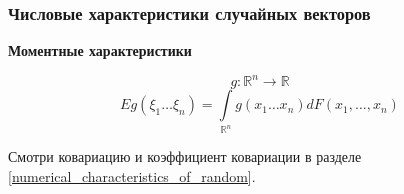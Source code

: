 \subsubsection{Числовые характеристики случайных векторов}
\begin{figure}[H]
\end{figure}

\begin{center}
	\textbf{Моментные характеристики}
\end{center}
\[ g: \mathbb{R}^n \to \mathbb{R} \]
\[ Eg (\xi_1 \dots \xi_n) = \int\limits_{\mathbb{R}^n} g (x_1 \dots x_n) d F(x_1, \dots, x_n) \]

Смотри ковариацию и коэффициент ковариации в разделе \ref{numerical_characteristics_of_random}.

